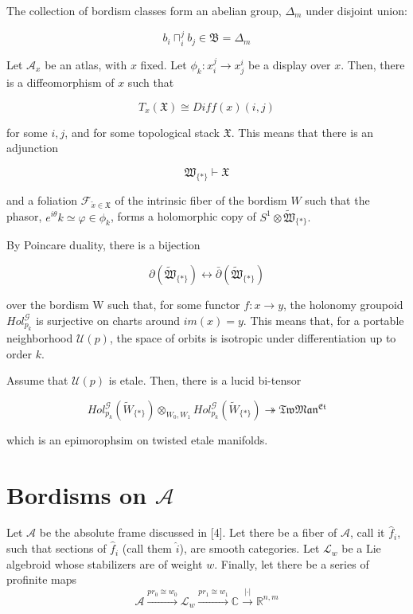 \documentclass{article}
\begin{document}
	The collection of bordism classes form an abelian group, $\Delta_m$ under disjoint union:
	
	$$b_i \sqcap_i^j b_j \in \mathfrak{B} = \Delta_m$$
	
	Let $\mathcal{A}_x$ be an atlas, with $x$ fixed. Let $\phi_k: x_i^j \longrightarrow x_j^i$ be a display over $x$. Then, there is a diffeomorphism of $x$ such that
	
	$$T_x(\mathfrak{X}) \cong Diff(x)(i,j)$$
	
	for some $i,j$, and for some topological stack $\mathfrak{X}$. This means that there is an adjunction
	
	$$\mathfrak{W}_{\{\ast\}} \vdash \mathfrak{X}$$
	
	and a foliation $\mathcal{F}_{\tilde{x} \in \mathfrak{X}}$ of the intrinsic fiber of the bordism $W$ such that the phasor, $e^{i \theta}k \simeq \varphi \in \phi_k$, forms a holomorphic copy of $S^1 \otimes \tilde{\mathfrak{W}}_{\{\ast\}}.$ 
	
	By Poincare duality, there is a bijection
	
	$$\partial(\tilde{\mathfrak{W}}_{\{\ast\}}) \leftrightarrow \bar{\partial}(\tilde{\mathfrak{W}}_{\{\ast\}})$$
		
	over the bordism W such that, for some functor $f: x \longrightarrow y$, the holonomy groupoid $Hol_{p_k}^\mathscr{G}$ is surjective on charts around $im(x) = y$. This means that, for a portable neighborhood $\mathcal{U}(p)$, the space of orbits is isotropic under differentiation up to order $k$.
	
	Assume that $\mathcal{U}(p)$ is etale. Then, there is a lucid bi-tensor
	
	$$Hol_{p_k}^\mathcal{G}(\tilde{W}_{\{\ast\}}) \otimes_{W_0,W_1} Hol_{p_k}^\mathcal{G}(\tilde{W}_{\{\ast\}}) \twoheadrightarrow \mathfrak{TwMan^{Et}}$$
	
	which is an epimorophsim on twisted etale manifolds.
	
	\section{Bordisms on $\mathscr{A}$}
	
	Let $\mathscr{A}$ be the absolute frame discussed in [4]. Let there be a fiber of $\mathscr{A}$, call it $\hat{f}_i$, such that sections of $\hat{f}_i$ (call them $\hat{i}$), are smooth categories. Let $\mathscr{L}_w$ be a Lie algebroid whose stabilizers are of weight $w$. Finally, let there be a series of profinite maps $$\mathscr{A} \xrightarrow{pr_0 \cong w_0} \mathscr{L}_w \xrightarrow{pr_1 \cong w_1} \mathbb{C} \xrightarrow{|\cdot|} \mathbb{R}^{n,m}$$
	
\end{document}
